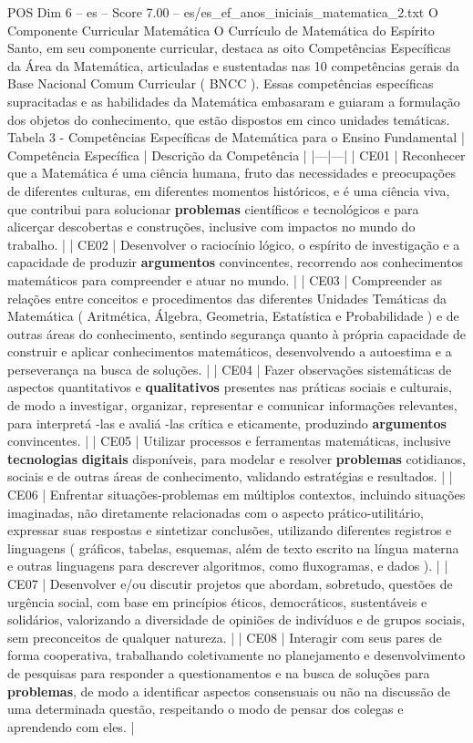 \begin{textsample}{POS Dim 6 – es – Score 7.00 – es/es\_ef\_anos\_iniciais\_matematica\_2.txt}  \label{ex:f6_pos_148}
O Componente Curricular Matemática O Currículo de Matemática do Espírito Santo, em seu componente curricular, destaca as oito Competências Específicas da Área da Matemática, articuladas e sustentadas nas 10 competências gerais da Base Nacional Comum Curricular ( BNCC ).
Essas competências específicas supracitadas e as habilidades da Matemática embasaram e guiaram a formulação dos objetos do conhecimento, que estão dispostos em cinco unidades temáticas.
Tabela 3 - Competências Específicas de Matemática para o Ensino Fundamental | Competência Específica | Descrição da Competência | |---|---| | CE01 | Reconhecer que a Matemática é uma ciência humana, fruto das necessidades e preocupações de diferentes culturas, em diferentes momentos históricos, e é uma ciência viva, que contribui para solucionar \textbf{problemas} científicos e tecnológicos e para alicerçar descobertas e construções, inclusive com impactos no mundo do trabalho. | | CE02 | Desenvolver o raciocínio lógico, o espírito de investigação e a capacidade de produzir \textbf{argumentos} convincentes, recorrendo aos conhecimentos matemáticos para compreender e atuar no mundo. | | CE03 | Compreender as relações entre conceitos e procedimentos das diferentes Unidades Temáticas da Matemática ( Aritmética, Álgebra, Geometria, Estatística e Probabilidade ) e de outras áreas do conhecimento, sentindo segurança quanto à própria capacidade de construir e aplicar conhecimentos matemáticos, desenvolvendo a autoestima e a perseverança na busca de soluções. | | CE04 | Fazer observações sistemáticas de aspectos quantitativos e \textbf{qualitativos} presentes nas práticas sociais e culturais, de modo a investigar, organizar, representar e comunicar informações relevantes, para interpretá -las e avaliá -las crítica e eticamente, produzindo \textbf{argumentos} convincentes. | | CE05 | Utilizar processos e ferramentas matemáticas, inclusive \textbf{tecnologias} \textbf{digitais} disponíveis, para modelar e resolver \textbf{problemas} cotidianos, sociais e de outras áreas de conhecimento, validando estratégias e resultados. | | CE06 | Enfrentar situações-problemas em múltiplos contextos, incluindo situações imaginadas, não diretamente relacionadas com o aspecto prático-utilitário, expressar suas respostas e sintetizar conclusões, utilizando diferentes registros e linguagens ( gráficos, tabelas, esquemas, além de texto escrito na língua materna e outras linguagens para descrever algoritmos, como fluxogramas, e dados ). | | CE07 | Desenvolver e/ou discutir projetos que abordam, sobretudo, questões de urgência social, com base em princípios éticos, democráticos, sustentáveis e solidários, valorizando a diversidade de opiniões de indivíduos e de grupos sociais, sem preconceitos de qualquer natureza. | | CE08 | Interagir com seus pares de forma cooperativa, trabalhando coletivamente no planejamento e desenvolvimento de pesquisas para responder a questionamentos e na busca de soluções para \textbf{problemas}, de modo a identificar aspectos consensuais ou não na discussão de uma determinada questão, respeitando o modo de pensar dos colegas e aprendendo com eles. | 
\end{textsample}
